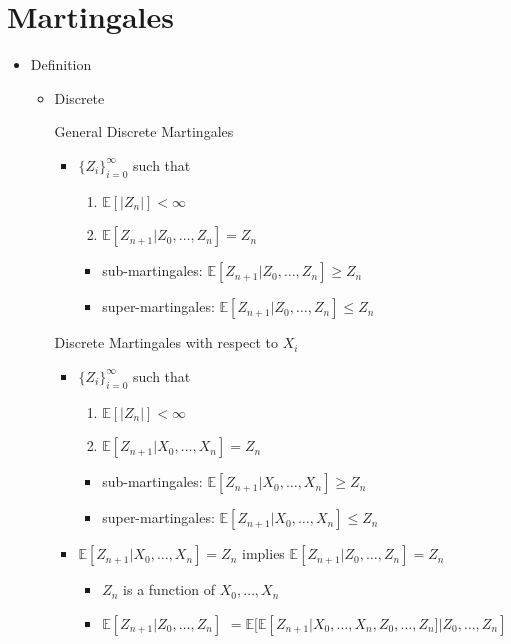 \documentclass[a4paper]{article}
\begin{document}
\section{Martingales}
\begin{itemize}
    \item Definition
        \begin{itemize}
            \item Discrete

                General Discrete Martingales
                \begin{itemize}
                    \item $\{Z_i\}_{i=0}^\infty$ such that
                        \begin{enumerate}
                            \item $\mathbb{E}[|Z_n|] < \infty$
                            \item $\mathbb{E}[Z_{n+1}| Z_0, \dots, Z_n] = Z_n$
                        \end{enumerate}
                        \begin{itemize}
                            \item sub-martingales: $\mathbb{E}[Z_{n+1}| Z_0, \dots, Z_n] \geq Z_n$
                            \item super-martingales: $\mathbb{E}[Z_{n+1}| Z_0, \dots, Z_n] \leq Z_n$
                        \end{itemize}
                \end{itemize}
                Discrete Martingales with respect to $X_i$
                \begin{itemize}
                    \item $\{Z_i\}_{i=0}^\infty$ such that
                        \begin{enumerate}
                            \item $\mathbb{E}[|Z_n|] < \infty$
                            \item $\mathbb{E}[Z_{n+1}| X_0, \dots, X_n] = Z_n$
                        \end{enumerate}
                        \begin{itemize}
                            \item sub-martingales: $\mathbb{E}[Z_{n+1}| X_0, \dots, X_n] \geq Z_n$
                            \item super-martingales: $\mathbb{E}[Z_{n+1}| X_0, \dots, X_n] \leq Z_n$
                        \end{itemize}
                    \item $\mathbb{E}[Z_{n+1}| X_0, \dots, X_n] = Z_n$ implies $\mathbb{E}[Z_{n+1}| Z_0, \dots, Z_n] = Z_n$
                        \begin{itemize}
                            \item $Z_n$ is a function of $X_0, \dots, X_n$
                            \item $\mathbb{E}[Z_{n+1}| Z_0, \dots, Z_n]$
                                $= \mathbb{E}[\mathbb{E}[Z_{n+1}| X_0, \dots, X_n, Z_0, \dots, Z_n]| Z_0, \dots, Z_n]$


\end{itemize}
\end{itemize}
\end{itemize}
\end{itemize}
\end{document}

